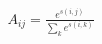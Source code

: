\documentclass[preview]{standalone}
\begin{document}
\begin{align*}
A_{ij} = \frac{e^{s(i,j)}}{\sum_{k} e^{s(i,k)}}
\end{align*}
\end{document}
